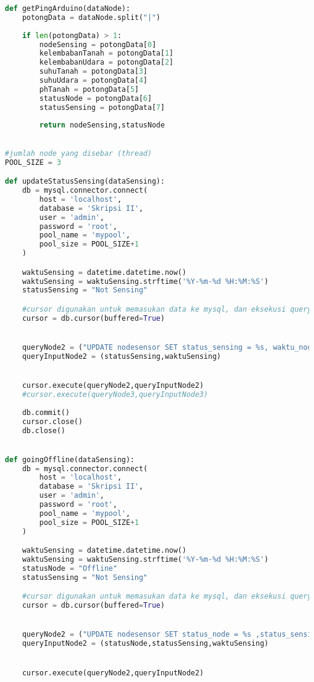 \begin{lstlisting}[language=Python, caption=BaseStation.py]
def getPingArduino(dataNode):
    potongData = dataNode.split("|")
    
    if len(potongData) > 1:
        nodeSensing = potongData[0]
        kelembabanTanah = potongData[1]
        kelembabanUdara = potongData[2]
        suhuTanah = potongData[3]
        suhuUdara = potongData[4]
        phTanah = potongData[5]
        statusNode = potongData[6]
        statusSensing = potongData[7]        
        
        return nodeSensing,statusNode
    

#jumlah node yang disebar (thread)
POOL_SIZE = 3

def updateStatusSensing(dataSensing):
    db = mysql.connector.connect(
        host = 'localhost',
        database = 'Skripsi II',
        user = 'admin',
        password = 'root',
        pool_name = 'mypool',
        pool_size = POOL_SIZE+1
    )

    waktuSensing = datetime.datetime.now()
    waktuSensing = waktuSensing.strftime('%Y-%m-%d %H:%M:%S')
    statusSensing = "Not Sensing"

    #cursor digunakan untuk memasukan data ke mysql, dan eksekusi query
    cursor = db.cursor(buffered=True)


    queryNode2 = ("UPDATE nodesensor SET status_sensing = %s, waktu_node = %s")
    queryInputNode2 = (statusSensing,waktuSensing)


    cursor.execute(queryNode2,queryInputNode2)
    #cursor.execute(queryNode3,queryInputNode3)
    
    db.commit()
    cursor.close()
    db.close()


def goingOffline(dataSensing):
    db = mysql.connector.connect(
        host = 'localhost',
        database = 'Skripsi II',
        user = 'admin',
        password = 'root',
        pool_name = 'mypool',
        pool_size = POOL_SIZE+1
    )

    waktuSensing = datetime.datetime.now()
    waktuSensing = waktuSensing.strftime('%Y-%m-%d %H:%M:%S')
    statusNode = "Offline"
    statusSensing = "Not Sensing"

    #cursor digunakan untuk memasukan data ke mysql, dan eksekusi query
    cursor = db.cursor(buffered=True)


    queryNode2 = ("UPDATE nodesensor SET status_node = %s ,status_sensing = %s, waktu_node = %s WHERE kode_node != 5")
    queryInputNode2 = (statusNode,statusSensing,waktuSensing)


    cursor.execute(queryNode2,queryInputNode2)
    

\end{lstlisting}
